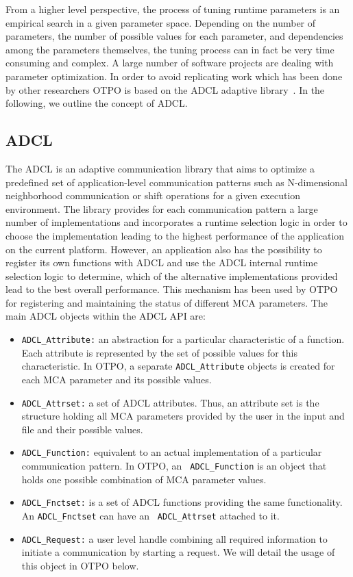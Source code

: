 From a higher level perspective, the process of tuning runtime parameters is an empirical search in a given parameter space. Depending on the number of parameters, the number of possible values for each parameter, and dependencies among the parameters themselves, the tuning process can in fact be very time consuming and complex. A large number of software projects are dealing with parameter optimization. In order to avoid replicating work which has been done by other researchers OTPO is based on the ADCL adaptive library~\cite{ADCL}. In the following, we outline the concept of ADCL. 

\subsection{ADCL}

The ADCL is an adaptive communication library that aims to optimize a
predefined set of application-level communication patterns such as
N-dimensional neighborhood communication or shift operations for a
given execution environment. The library provides for each
communication pattern a large number of implementations and
incorporates a runtime selection logic in order to choose the
implementation leading to the highest performance of the application
on the current platform. However, an application also has the
possibility to register its own functions with ADCL and use the ADCL
internal runtime selection logic to determine, which of the
alternative implementations provided lead to the best overall
performance. This mechanism has been used by OTPO for registering and
maintaining the status of different MCA parameters. The main 
ADCL objects within the ADCL API are:

\begin{itemize}
\item {\tt ADCL\_\-Attribute:} an abstraction for a particular
  characteristic of a function. Each attribute is represented by the
  set of possible values for this characteristic. In OTPO, a separate
  {\tt ADCL\_\-Attribute} objects is created for each MCA parameter
  and its possible values.
\item {\tt ADCL\_\-Attrset:} a set of ADCL attributes. Thus, an
  attribute set is the structure holding all MCA parameters provided
  by the user in the input and file and their possible values.
\item {\tt ADCL\_\-Function:} equivalent to an actual implementation
  of a particular communication pattern. In OTPO, an {\tt
    ADCL\_\-Function} is an object that holds one possible combination
  of MCA parameter values.
\item {\tt ADCL\_\-Fnctset:} is a set of ADCL functions providing the
  same functionality. An {\tt ADCL\_\-Fnctset} can have an {\tt
    ADCL\_\-Attrset} attached to it.
\item {\tt ADCL\_\-Request:} a user level handle combining all
  required information to initiate a communication by starting a
  request. We will detail the usage of this object in OTPO below.
\end{itemize}

